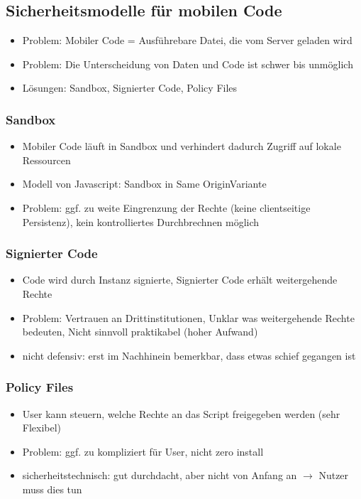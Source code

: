 \documentclass{article} %
\begin{document}
	\subsection{Sicherheitsmodelle für mobilen Code}
	\begin{itemize}
		\item Problem: Mobiler Code = Ausführebare Datei, die vom Server geladen wird
		\item Problem: Die Unterscheidung von Daten und Code ist schwer bis unmöglich
		\item Lösungen: Sandbox, Signierter Code, Policy Files
	\end{itemize}
	\subsubsection{Sandbox}
	\begin{itemize}
		\item Mobiler Code läuft in Sandbox und verhindert dadurch Zugriff auf lokale Ressourcen 
		\item Modell von Javascript: Sandbox in \glqq Same Origin\grqq Variante
		\item Problem: ggf. zu weite Eingrenzung der Rechte (keine clientseitige Persistenz), kein kontrolliertes Durchbrechnen möglich
	\end{itemize}
	\subsubsection{Signierter Code}
	\begin{itemize}
		\item Code wird durch Instanz signierte, Signierter Code erhält weitergehende Rechte
		\item Problem: Vertrauen an Drittinstitutionen, Unklar was weitergehende Rechte bedeuten, Nicht sinnvoll praktikabel (hoher Aufwand)
		\item nicht defensiv: erst im Nachhinein bemerkbar, dass etwas schief gegangen ist
	\end{itemize}
	\subsubsection{Policy Files}
	\begin{itemize}
		\item User kann steuern, welche Rechte an das Script freigegeben werden (sehr Flexibel)
		\item Problem: ggf. zu kompliziert für User, nicht zero install
		\item sicherheitstechnisch: gut durchdacht, aber nicht von Anfang an $\rightarrow$ Nutzer muss dies tun
	\end{itemize}
	
\end{document}

